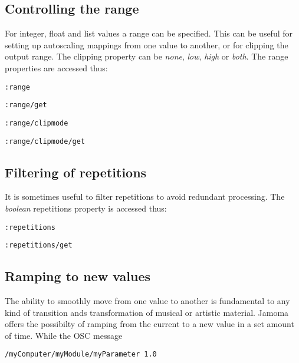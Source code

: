 \documentclass{sig-alternate}
\begin{document}




\subsection{Controlling the range} %
\label{sub:range}

For integer, float and list values a range can be specified. This can be useful for setting up autoscaling mappings from one value to another, or for clipping the output range. The clipping property can be \emph{none}, \emph{low}, \emph{high} or \emph{both}. The range properties are accessed thus:

\texttt{:range}

\texttt{:range/get}

\texttt{:range/clipmode}

\texttt{:range/clipmode/get}





\subsection{Filtering of repetitions} %
\label{sub:filtering_of_repetitions}

It is sometimes useful to filter repetitions to avoid redundant processing. The \emph{boolean} repetitions property is accessed thus:

\texttt{:repetitions}

\texttt{:repetitions/get}





\subsection{Ramping to new values} %
\label{sub:ramping_to_new_values}

The ability to smoothly move from one value to another is fundamental to any kind of transition ands transformation of musical or artistic material. Jamoma offers the possibilty of ramping from the current to a new value in a set amount of time. While the OSC message

\texttt{/myComputer/myModule/myParameter 1.0}
\end{document}
